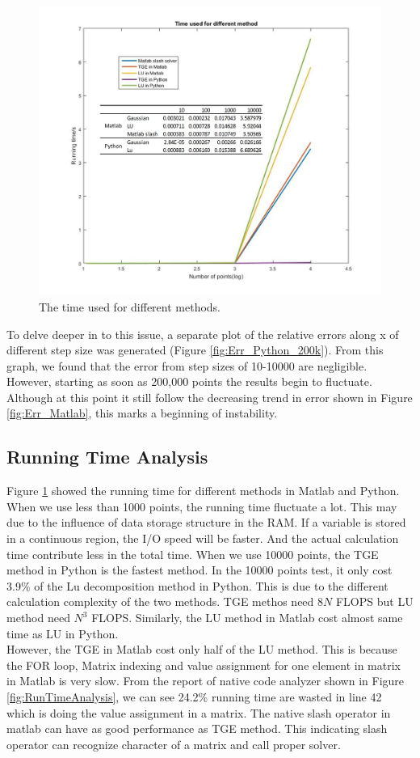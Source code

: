 \documentclass{article}
\begin{document}
  \begin{figure}[h]
  	\centering
  	\includegraphics[width=0.7\linewidth]{../figures/Time_all_Table}
  	\caption{The time used for different methods.}
  	\label{fig:Time_all_Table}
  \end{figure}
  
  To delve deeper in to this issue, a separate plot of the relative errors along x of different step size was generated (Figure \ref{fig:Err_Python_200k}). From this graph, we found that the error from step sizes of 10-10000 are negligible. However, starting as soon as 200,000 points the results begin to fluctuate. Although at this point it still follow the decreasing trend in error shown in Figure \ref{fig:Err_Matlab}, this marks a beginning of instability.
  

\subsection{Running Time Analysis}



Figure \ref{fig:Time_all_Table} showed the running time for different methods in Matlab and Python. When we use less than 1000 points, the running time fluctuate a lot. This may due to the influence of data storage structure in the RAM. If a variable is stored in a continuous region, the I/O speed will be faster. And the actual calculation time contribute less in the total time. When we use 10000 points, the TGE method in Python is the fastest method. In the 10000 points test, it only cost 3.9\% of the Lu decomposition method in Python. This is due to the different calculation complexity of the two methods. TGE methos need $8N$ FLOPS but LU method need $N^3$ FLOPS. Similarly, the LU method in Matlab cost almost same time as LU in Python.\\
However, the TGE in Matlab cost only half of the LU method. This is because the FOR loop, Matrix indexing and value assignment for one element in matrix in Matlab is very slow. From the report of native code analyzer shown in Figure \ref{fig:RunTimeAnalysis}, we can see 24.2\% running time are wasted in line 42 which is doing the value assignment in a matrix.
The native slash operator in matlab can have as good performance as TGE method. This indicating slash operator can recognize character of a matrix and call proper solver. 
\end{document}
